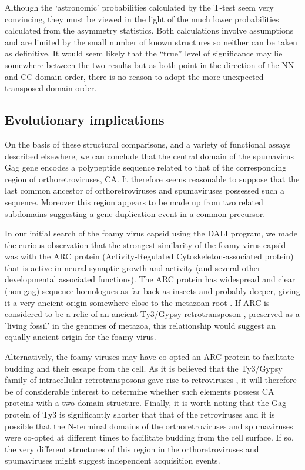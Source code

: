 Although the `astronomic' probabilities calculated by the T-test seem very convincing, they
must be viewed in the light of the much lower probabilities calculated from the asymmetry
statistics.   Both calculations involve assumptions and are limited by the small number of known
structures so neither can be taken as definitive.    It would seem likely that the ``true'' level of 
significance may lie somewhere between the two results but as both point in the direction of the NN and CC 
domain order, there is no reason to adopt the more unexpected transposed domain order. 

\subsection{Evolutionary implications}

On the basis of these structural comparisons, and a variety of functional assays described elsewhere, we can
conclude that the central domain of the spumavirus Gag gene encodes a polypeptide sequence related to that of
the corresponding region of orthoretroviruses, CA. It therefore seems reasonable to suppose that the last
common ancestor of orthoretroviruses and spumaviruses possessed such a sequence. Moreover this region appears
to be made up from two related subdomains suggesting a gene duplication event in a common precursor.

In our initial search of the foamy virus capsid using the DALI program, we made
the curious observation that the strongest similarity of the foamy virus capsid
was with the ARC protein (Activity-Regulated Cytoskeleton-associated protein) that
is active in neural synaptic growth and activity (and several other developmental associated functions).
The ARC protein has widespread and clear (non-gag) sequence homologues as far back as insects and probably
deeper, giving it a very ancient origin somewhere close to the metazoan root \cite{CampillosMet06}.
If ARC is considered to be a relic of an ancient Ty3/Gypsy retrotransposon \cite{ZhangWet15}, preserved
as a 'living fossil' in the genomes of metazoa, this relationship would suggest an equally
ancient origin for the foamy virus. 

Alternatively,
the foamy viruses may have co-opted an ARC protein to facilitate budding and their escape from the cell.
As it is believed that the Ty3/Gypsy family of intracellular retrotransposons gave rise to retroviruses
\cite{LlorensCet08}, 
it will therefore be of considerable interest to determine whether such elements possess CA proteins with
a two-domain structure. Finally, it is worth noting that the Gag protein of Ty3 is significantly shorter 
that that of the retroviruses and it is possible that the N-terminal domains of the orthoretroviruses 
and spumaviruses were co-opted at different times to facilitate budding from the cell surface. 
If so, the very different structures of this region in the orthoretroviruses and spumaviruses might suggest 
independent acquisition events. 
